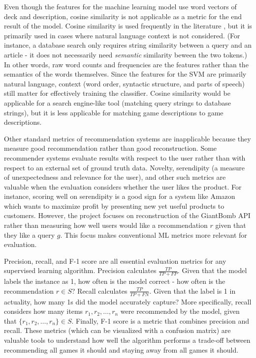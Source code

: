 \documentclass[10pt,twocolumn]{article}
\begin{document}
Even though the features for the machine learning model use word vectors of deck and description, cosine similarity is not applicable as a metric for the end result of the model. Cosine similarity is used frequently in the literature \cite{Ferdaous, Ryan_47, STata}, but it is primarily used in cases where natural language context is not considered. (For instance, a database search only requires string similarity between a query and an article - it does not necessarily need \textit{semantic} similarity beween the two tokens.) In other words, raw word counts and frequencies are the features rather than the semantics of the words themselves. Since the features for the SVM are primarily natural language, context (word order, syntactic structure, and parts of speech) still matter for effectively training the classifier. Cosine similarity would be applicable for a search engine-like tool (matching query strings to database strings), but it is less applicable for matching game descriptions to game descriptions.

Other standard metrics of recommendation systems are inapplicable because they measure good recommendation rather than good reconstruction. Some recommender systems evaluate results with respect to the user rather than with respect to an external set of ground truth data. Novelty, serendipity (a measure of unexpectedness and relevance for the user), and other such metrics are valuable when the evaluation considers whether the user likes the product. \cite{Cremonesi} For instance, scoring well on serendipity is a good sign for a system like Amazon \cite{AmazonRS} which wants to maximize profit by presenting new yet useful products to customers. However, the project focuses on reconstruction of the GiantBomb API rather than measuring how well users would like a recommendation $r$ given that they like a query $g$. This focus makes conventional ML metrics more relevant for evaluation.

Precision, recall, and F-1 score are all essential evaluation metrics for any supervised learning algorithm. \cite{NAlAzzam, Chowdhury, Sujatha} Precision calculates $\frac{TP}{TP + FP}$. Given that the model labels the instance as 1, how often is the model correct - how often is the recommendation $r \in S$? Recall calculates $\frac{TP}{TP + FN}$. Given that the label is 1 in actuality, how many 1s did the model accurately capture? More specifically, recall considers how many items $r_1, r_2, \dots, r_n$ were recommended by the model, given that $\{r_1, r_2, \dots, r_n\} \in S$. Finally, F-1 score is a metric that combines precision and recall. These metrics (which can be visualized with a confusion matrix) are valuable tools to understand how well the algorithm performs a trade-off between recommending all games it should and staying away from all games it should.
\end{document}
